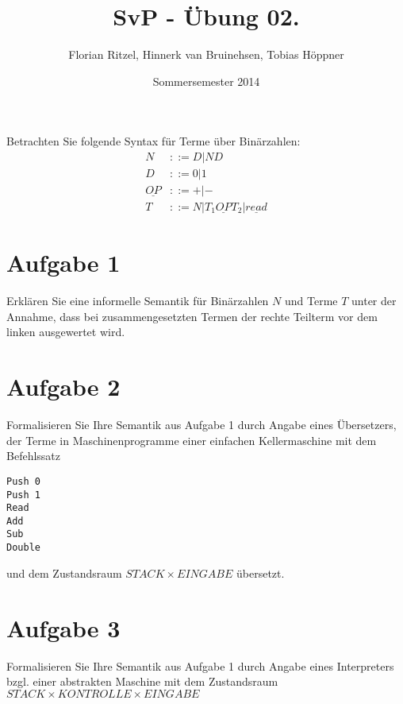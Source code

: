 \documentclass[ngerman,a4paper]{report}
\author{Florian Ritzel, Hinnerk van Bruinehsen, Tobias Höppner}
\title{SvP - Übung 02. }
\date{Sommersemester 2014}
\renewcommand{\maketitle}{}
\begin{document}
 
\maketitle 
Betrachten Sie folgende Syntax für Terme über Binärzahlen:
\begin{align*}
N &::= D | ND \\
D &::= 0 | 1 \\
\underline{OP} &::= + | - \\
T &::= N | T_1 \underline{OP}  T_2 | \underline{read}
\end{align*}
\section*{Aufgabe 1}
Erklären Sie eine informelle Semantik für Binärzahlen $N$ und Terme $T$ unter der Annahme, dass bei zusammengesetzten Termen der rechte Teilterm vor dem linken ausgewertet wird.
\section*{Aufgabe 2}
Formalisieren Sie Ihre Semantik aus Aufgabe 1 durch Angabe eines Übersetzers, der Terme in Maschinenprogramme einer einfachen Kellermaschine mit dem Befehlssatz
\begin{lstlisting}
Push 0
Push 1
Read
Add
Sub
Double
\end{lstlisting}
und dem Zustandsraum $STACK \times EINGABE$ übersetzt.
\section*{Aufgabe 3}
Formalisieren Sie Ihre Semantik aus Aufgabe 1 durch Angabe eines Interpreters bzgl. einer abstrakten Maschine mit dem Zustandsraum\\
$STACK \times KONTROLLE \times EINGABE$
\end{document}
